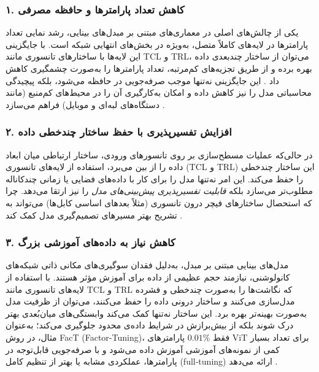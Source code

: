 \subsubsection{۱. \textbf{کاهش تعداد پارامترها و حافظه مصرفی}}

یکی از چالش‌های اصلی در معماری‌های مبتنی بر مبدل‌های بینایی، رشد نمایی تعداد پارامترها در لایه‌های کاملاً متصل، به‌ویژه در بخش‌های انتهایی شبکه است. با جایگزینی این لایه‌ها با ساختارهای تانسوری مانند TCL و TRL، می‌توان از ساختار چندبعدی داده بهره برده و از طریق تجزیه‌های کم‌مرتبه، تعداد پارامترها را به‌صورت چشمگیری کاهش داد \cite{novikov2015tensorizing, kossaifi2017tensorcontraction, kossaifi2020tensorregression}. این جایگزینی نه‌تنها موجب صرفه‌جویی در حافظه می‌شود، بلکه پیچیدگی محاسباتی مدل را نیز کاهش داده و امکان به‌کارگیری آن را در محیط‌های کم‌منبع (مانند دستگاه‌های لبه‌ای و موبایل) فراهم می‌سازد \cite{hamreras2025tensorization}.

\subsubsection{۲. \textbf{افزایش تفسیرپذیری با حفظ ساختار چندخطی داده}}

در حالی‌که عملیات مسطح‌سازی بر روی تانسورهای ورودی، ساختار ارتباطی میان ابعاد داده را از بین می‌برد، استفاده از لایه‌های تانسوری (TCL و TRL) این ساختار چندخطی را حفظ می‌کند. این امر نه‌تنها مدل را برای کار با داده‌های فضایی یا زمانی چندکاناله مطلوب‌تر می‌سازد بلکه \emph{قابلیت تفسیرپذیری پیش‌بینی‌های مدل} را نیز ارتقا می‌دهد. چرا که استحصال ساختارهای فیچر درون تانسوری (مثلاً بعدهای اساسی کابل‌ها) می‌تواند به تشریح بهتر مسیرهای تصمیم‌گیری مدل کمک کند \cite{hamreras2025tensorization}.

\subsubsection{۳. \textbf{کاهش نیاز به داده‌های آموزشی بزرگ}}

مدل‌های بینایی مبتنی بر مبدل، به‌دلیل فقدان سوگیری‌های مکانی ذاتی شبکه‌های کانولوشنی، نیازمند حجم عظیمی از داده برای آموزش مؤثر هستند. با استفاده از لایه‌های تانسوری مانند TCL و TRL که نگاشت‌ها را به‌صورت چندخطی و فشرده مدل‌سازی می‌کنند و ساختار درونی داده را حفظ می‌کنند، می‌توان از ظرفیت مدل به‌صورت بهینه‌تر بهره برد. این ساختار نه‌تنها کمک می‌کند وابستگی‌های میان‌بُعدی بهتر درک شوند بلکه از بیش‌برازش در شرایط داده‌ی محدود جلوگیری می‌کند؛ به‌عنوان مثال، در روش FacT (Factor‑Tuning)، فقط \(0.01\%\) پارامترهای ViT برای تعداد بسیار کمی از نمونه‌های آموزشی آموزش داده می‌شود و با صرفه‌جویی قابل‌توجه در پارامترها، عملکردی مشابه یا بهتر از تنظیم کامل (full‑tuning) ارائه می‌دهد \cite{jie2022fact}.


